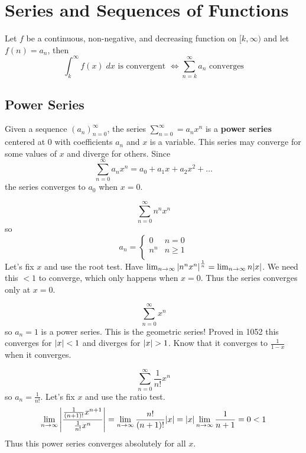 \documentclass{article}
\begin{document}
\section{Series and Sequences of Functions}
\begin{cthm}
  Let $f$ be a continuous, non-negative, and decreasing function on $[k, \infty)$ and let $f(n) = a_n$, then \[
    \int_k^{\infty} f(x)\; dx \text{ is convergent } \iff \sum_{n=k}^\infty a_n \text{ converges}
  \]
\end{cthm}
\subsection{Power Series}
\begin{definition}
  Given a sequence $(a_n)_{n=0}^\infty$, the series $\sum_{n=0}^\infty = a_nx^n$ is a \textbf{power series} centered at $0$ with coefficients $a_n$ and $x$ is a variable. This series may converge for some values of $x$ and diverge for others. Since \[
    \sum_{n=0}^\infty a_nx^n = a_0 + a_1x+a_2x^2 + \dots
  \] the series converges to $a_0$ when $x=0$.
\end{definition}
\begin{example}
  \[
    \sum_{n=0}^\infty n^n x^n
  \] so \[
    a_n =
    \begin{cases}
      0 & n=0\\
      n^n & n \geq 1\\
    \end{cases}
  \]
  Let's fix $x$ and use the root test. Have $\lim_{n\to\infty} \abs{n^nx^n}^{\frac{1}{n}} = \lim_{n\to\infty} n\abs{x}$. We need this $<1$ to converge, which only happens when $x=0$. Thus the series converges only at $x=0$.
\end{example}
\begin{example}
  \[
    \sum_{n=0}^\infty x^n
  \] so $a_n = 1$ is a power series.
  This is the geometric series! Proved in 1052 this converges for $\abs{x} < 1$ and diverges for $\abs{x} > 1$. Know that it converges to $\frac{1}{1-x}$ when it converges.
\end{example}
\begin{example}
  \[
    \sum_{n=0}^\infty \frac{1}{n!}x^n
  \] so $a_n = \frac{1}{n!}$.
  Let's fix $x$ and use the ratio test.
  \[
    \lim_{n\to\infty}\abs{\frac{\frac{1}{(n+1)!}x^{n+1}}{\frac{1}{n!}x^n}} = \lim_{n\to\infty} \frac{n!}{(n+1)!}\abs{x} = \abs{x}\lim_{n\to\infty} \frac{1}{n+1} = 0 < 1
  \]
  Thus this power series converges absolutely for all $x$.
\end{example}
\end{document}
